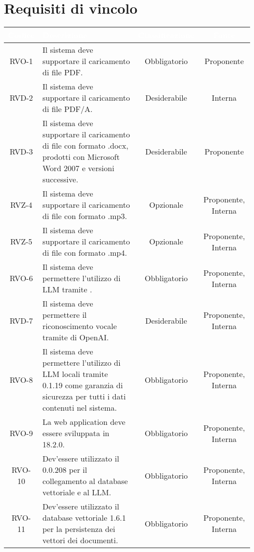 \section{Requisiti di vincolo}

\begingroup
\setlength{\tabcolsep}{10pt}
\renewcommand{\arraystretch}{1.5}
\begin{xltabular}{\textwidth}{| c | X | c | c |}
    \hline
     \textbf{\textcolor{white}{Codice}} & \textbf{\textcolor{white}{Descrizione}} & \textbf{\textcolor{white}{Classificazione}} & \textbf{\textcolor{white}{Fonte}}\\
    \hline
    \endhead
    RVO-1 & Il sistema deve supportare il caricamento di file PDF. & Obbligatorio & Proponente \\
    \hline
    RVD-2 & Il sistema deve supportare il caricamento di file PDF/A. & Desiderabile & Interna \\
    \hline
    RVD-3 & Il sistema deve supportare il caricamento di  file con formato .docx, prodotti con Microsoft Word 2007 e versioni successive. & Desiderabile & Proponente \\
    \hline
    RVZ-4 & Il sistema deve supportare il caricamento di  file con formato .mp3. & Opzionale & Proponente, Interna \\
    \hline
    RVZ-5 & Il sistema deve supportare il caricamento di  file con formato .mp4. & Opzionale & Proponente, Interna \\
    \hline
    RVO-6 & Il sistema deve permettere l'utilizzo di LLM tramite . & Obbligatorio & Proponente, Interna \\
    \hline
    RVD-7 & Il sistema deve permettere il riconoscimento vocale tramite  di OpenAI. & Desiderabile & Proponente, Interna \\
    \hline
    RVO-8 & Il sistema deve permettere l'utilizzo di LLM locali tramite  0.1.19 come garanzia di sicurezza per tutti i dati contenuti nel sistema. & Obbligatorio & Proponente, Interna \\
    \hline
    RVO-9 & La web application deve essere sviluppata in  18.2.0. & Obbligatorio & Proponente, Interna \\
    \hline
    RVO-10 & Dev'essere utilizzato il   0.0.208 per il collegamento al database vettoriale e al LLM. & Obbligatorio & Proponente, Interna \\
    \hline
    RVO-11 & Dev'essere utilizzato il database vettoriale  1.6.1 per la persistenza dei vettori  dei documenti. & Obbligatorio & Proponente, Interna \\

\end{xltabular}
